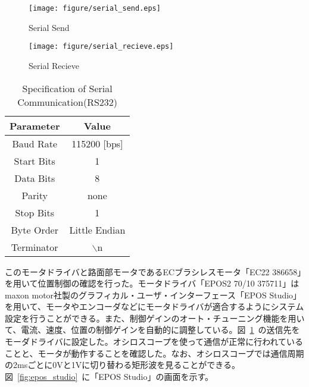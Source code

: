 \documentclass[a4paper,12pt]{article_vdlab_sotsuron}
\begin{document}
\vspace*{10mm}
\begin{figure}[htp]
  \begin{center}
    \texttt{[image: figure/serial\_send.eps]}
    \vspace*{3mm}
    \caption{Serial Send}
    \label{fig:serial_send}
  \end{center}
\end{figure}

\vspace*{10mm}
\begin{figure}[htp]
  \begin{center}
    \texttt{[image: figure/serial\_recieve.eps]}
      \vspace*{3mm}
      \caption{Serial Recieve}
      \label{fig:serial_recieve}
  \end{center}
\end{figure}

\newpage
\begin{table}[htp]
  \begin{center}
    \makeatletter
    \def\@captype{table}   
    \makeatother
    \caption{Specification of Serial Communication(RS232)}
      \label{tab:serial}
	\begin{tabular}{cc}\hline
	  Parameter & Value\\\hline
	  Baud Rate & 115200 [bps]\\ 
	  Start Bits & 1\\
	  Data Bits & 8\\
	  Parity & none\\ 
	  Stop Bits & 1\\
	  Byte Order & Little Endian\\
	  Terminator & $\backslash$n\\\hline
      \end{tabular}  
    \end{center}
\end{table}

\vspace*{10mm}
このモータドライバと路面部モータであるECブラシレスモータ「EC22 386658」を用いて位置制御の確認を行った。モータドライバ「EPOS2 70/10 375711」はmaxon motor社製のグラフィカル・ユーザ・インターフェース「EPOS Studio」を用いて、モータやエンコーダなどにモータドライバが適合するようにシステム設定を行うことができる。\cite{22}また、制御ゲインのオート・チューニング機能を用いて、電流、速度、位置の制御ゲインを自動的に調整している。図~\ref{fig:serial_send}~の送信先をモーダドライバに設定した。オシロスコープを使って通信が正常に行われていることと、モータが動作することを確認した。なお、オシロスコープでは通信周期の2msごとに0Vと1Vに切り替わる矩形波を見ることができる。図~\ref{fig:epos_studio}~に「EPOS Studio」の画面を示す。
\end{document}
